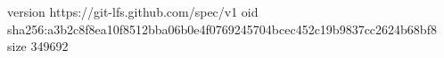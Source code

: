 version https://git-lfs.github.com/spec/v1
oid sha256:a3b2c8f8ea10f8512bba06b0e4f0769245704bcec452c19b9837cc2624b68bf8
size 349692
